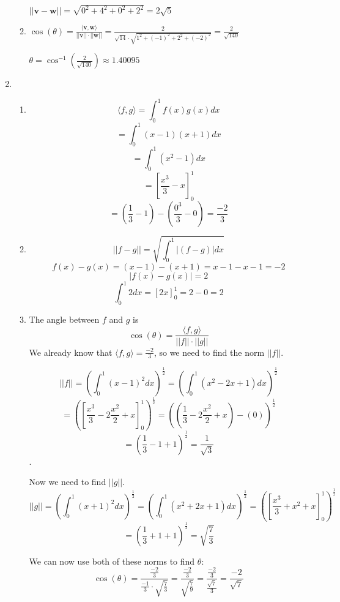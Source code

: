 \documentclass[12pt]{article}
\begin{document}
\begin{enumerate}[leftmargin=0em]
\begin{enumerate}[leftmargin=!]
    $||\mathbf{v} - \mathbf{w}|| = \sqrt{0^{2} + 4^{2} + 0^{2} + 2^{2}} = 2\sqrt{5}$

    \item $\cos(\theta) = \frac{\langle \mathbf{v}, \mathbf{w} \rangle}{||\mathbf{v}||\cdot||\mathbf{w}||} = \frac{2}{\sqrt{14} \cdot \sqrt{1^{2} + (-1)^{2} + 2^{2} + (-2)^{2}}} = \frac{2}{\sqrt{140}}$ 
    
    $\theta = \cos^{-1}(\frac{2}{\sqrt{140}}) \approx 1.40095$
  \end{enumerate}


  \item
  \begin{enumerate}[leftmargin=!]
    \item
    \[ \langle f, g \rangle = \int_{0}^{1}f(x)g(x)dx\]
    \[ = \int_{0}^{1}(x-1)(x+1)dx\]
    \[ = \int_{0}^{1}(x^2-1)dx\]
    \[ = [\frac{x^3}{3} - x]^{1}_0\]
    \[ = (\frac{1}{3} - 1) - (\frac{0^3}{3} - 0) = \frac{-2}{3}\]
    \item
    \[ || f - g || = \sqrt{\int_{0}^{1}|(f-g)|dx}\]
    \[ f(x) - g(x) = (x-1) - (x+1) = x - 1 - x - 1 = -2\]
    \[ |f(x) - g(x)| = 2\]
    \[ \int_{0}^{1}2dx = [2x]^{1}_0 = 2 - 0 = 2\]
    \item
    The angle between $f$ and $g$ is
    \[ \cos(\theta) = \frac{\langle f, g \rangle}{||f|| \cdot ||g||}\]
    We already know that $\langle f, g \rangle = \frac{-2}{3}$, so we need to find the norm $||f||$.

    \[||f|| = (\int_{0}^{1}(x-1)^2dx)^{\frac{1}{2}} = (\int_{0}^{1}(x^2-2x+1)dx)^{\frac{1}{2}}\]
    \[ = ([\frac{x^3}{3}-2\frac{x^2}{2} + x]^1_0)^\frac{1}{2} = ((\frac{1}{3} - 2\frac{x^2}{2} + x) - (0))^\frac{1}{2}\]
    \[ = (\frac{1}{3} - 1 +1)^{\frac{1}{2}} = \frac{1}{\sqrt{3}}\].

    Now we need to find $||g||$.
    \[ ||g|| = (\int_{0}^{1}(x+1)^2dx)^{\frac{1}{2}} = (\int_{0}^{1}(x^2+2x+1)dx)^{\frac{1}{2}} = ([\frac{x^3}{3} + x^{2} + x]^{1}_0)^{\frac{1}{2}}\]
    \[ = (\frac{1}{3} + 1 + 1)^\frac{1}{2} = \sqrt{\frac{7}{3}}\]

    We can now use both of these norms to find $\theta$:
    \[ \cos(\theta) = \frac{\frac{-2}{3}}{\frac{-1}{3} \cdot \sqrt{\frac{7}{3}}} = \frac{\frac{-2}{3}}{\sqrt{\frac{7}{9}}} = \frac{\frac{-2}{3}}{\frac{\sqrt{7}}{3}} = \frac{-2}{\sqrt{7}}\]


\end{enumerate}
\end{enumerate}
\end{document}
